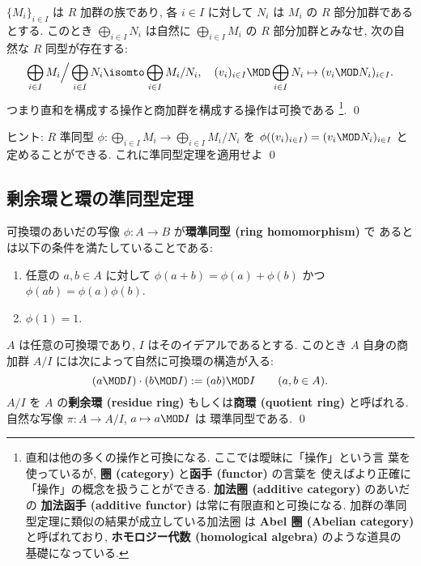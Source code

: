 \documentclass[12pt,twoside]{jarticle}
\begin{document}
\begin{question}
\label{q:quot-sum}
  $\{M_i\}_{i\in I}$ は $R$ 加群の族であり, 
  各 $i\in I$ に対して $N_i$ は $M_i$ の $R$ 部分加群であるとする.
  このとき $\bigoplus_{i\in I}N_i$ は自然に $\bigoplus_{i\in I}M_i$ 
  の $R$ 部分加群とみなせ, 次の自然な $R$ 同型が存在する:
  \begin{equation*}
    \bigoplus_{i\in I}M_i\Big/\bigoplus_{i\in I}N_i
    \isomto \bigoplus_{i\in I}M_i/N_i,
    \quad
    (v_i)_{i\in I}\MOD \bigoplus_{i\in I}N_i
    \mapsto
    (v_i\MOD N_i)_{i\in I}.
  \end{equation*}
  つまり直和を構成する操作と商加群を構成する操作は可換である%
  \footnote{直和は他の多くの操作と可換になる. ここでは曖昧に「操作」という言
    葉を使っているが, {\bf 圈 (category)} と{\bf 函手 (functor)} の言葉を
    使えばより正確に「操作」の概念を扱うことができる. 
    {\bf 加法圈 (additive category)} のあいだの
    {\bf 加法函手 (additive functor)} は常に有限直和と可換になる.  
    加群の準同型定理に類似の結果が成立している加法圈
    は {\bf Abel 圈 (Abelian category)} と呼ばれており, 
    {\bf ホモロジー代数 (homological algebra)} のような道具の
    基礎になっている.}.
  \qed
\end{question}

\noindent
ヒント: $R$ 準同型 $\phi:\bigoplus_{i\in I}M_i\to\bigoplus_{i\in I}M_i/N_i$ 
を $\phi((v_i)_{i\in I})=(v_i\MOD N_i)_{i\in I}$ と定めることができる.
これに準同型定理を適用せよ
\qed


\subsection{剰余環と環の準同型定理}
\label{sec:ring-hom}

可換環のあいだの写像 $\phi:A\to B$ が{\bf 環準同型 (ring homomorphism)} で
あるとは以下の条件を満たしていることである:
\begin{enumerate}
\item 任意の $a,b\in A$ に対して $\phi(a+b)=\phi(a)+\phi(b)$ 
  かつ $\phi(ab)=\phi(a)\phi(b)$.
\item $\phi(1)=1$.
\end{enumerate}

\begin{question}[剰余環]
  $A$ は任意の可換環であり, $I$ はそのイデアルであるとする.
  このとき $A$ 自身の商加群 $A/I$ には次によって自然に可換環の構造が入る:
  \begin{equation*}
    (a\MOD I)\cdot(b\MOD I) := (ab)\MOD I
    \qquad (a,b\in A).
  \end{equation*}
  $A/I$ を $A$ の{\bf 剰余環 (residue ring)} 
  もしくは{\bf 商環 (quotient ring)} と呼ばれる.  
  自然な写像 $\pi:A\to A/I$, $a\mapsto a\MOD I$ は
  環準同型である.  \qed
\end{question}
\end{document}
